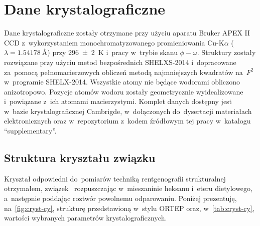 \section{Dane krystalograficzne}\label{experimental:xray}
Dane krystalograficzne zostały otrzymane przy użyciu aparatu Bruker APEX II CCD
  z~wykorzystaniem monochromatyzowanego promieniowania Cu-K$\alpha$
  ($\lambda=\SI{1.54178}{\angstrom}$) przy \SI{296(2)}{\kelvin} i~pracy w~trybie skanu $\phi-\omega$.
Struktury zostały rozwiązane przy użyciu metod bezpośrednich SHELXS-2014 
  i~dopracowane za~pomocą pełnomacierzowych obliczeń metodą najmniejszych kwadratów na~$F^2$
  w~programie SHELX-2014.
Wszystkie atomy nie będące wodorami obliczono anizotropowo.
Pozycje atomów wodoru zostały geometrycznie wyidealizowane i~powiązane z~ich atomami macierzystymi.
Komplet danych dostępny jest w~bazie krystalograficznej Cambrigde, w~dołączonych do~dysertacji materiałach elektronicznych oraz w~repozytorium\sidenote{\repourl}
  z~kodem źródłowym tej pracy w~katalogu \enquote{supplementary}.

\pagebreak
\subsection{Struktura kryształu związku }
Kryształ odpowiedni do~pomiarów techniką rentgenografii strukturalnej otrzymałem,
  związek~ rozpuszczając w~mieszaninie heksanu i~eteru dietylowego,
  a~następnie poddając roztwór powolnemu odparowaniu.
Poniżej prezentuję, na~\cref{fig:cryst-cy}, strukturę przedstawioną w~stylu ORTEP
  oraz, w~\cref{tab:cryst-cy}, wartości wybranych parametrów krystalograficznych.

